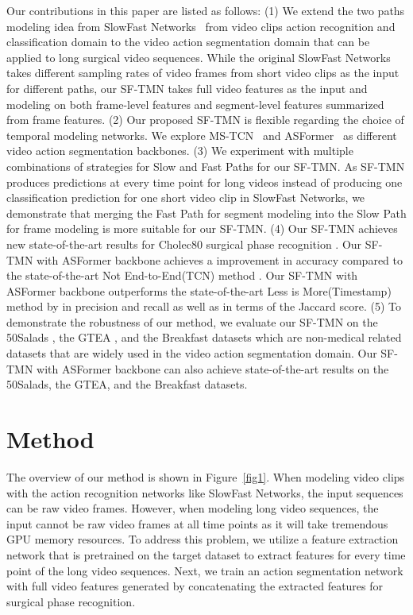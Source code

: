 \documentclass[sn-mathphys,Numbered]{sn-jnl}
\theoremstyle{thmstyleone}\newtheorem{theorem}{Theorem}\newtheorem{proposition}[theorem]{Proposition}
\theoremstyle{thmstyletwo}\newtheorem{example}{Example}\newtheorem{remark}{Remark}
\theoremstyle{thmstylethree}\newtheorem{definition}{Definition}
\begin{document}
Our contributions in this paper are listed as follows: (1) We extend the two paths modeling idea from SlowFast Networks~\cite{feichtenhofer2019slowfast} from video clips action recognition and classification domain to the video action segmentation domain that can be applied to long surgical video sequences. While the original SlowFast Networks takes different sampling rates of video frames from short video clips as the input for different paths, our SF-TMN takes full video features as the input and modeling on both frame-level features and segment-level features summarized from frame features. (2) Our proposed SF-TMN is flexible regarding the choice of temporal modeling networks. We explore MS-TCN~\cite{farha2019ms} and ASFormer~\cite{yi2021asformer} as different video action segmentation backbones. (3) We experiment with multiple combinations of strategies for Slow and Fast Paths for our SF-TMN. As SF-TMN produces predictions at every time point for long videos instead of producing one classification prediction for one short video clip in SlowFast Networks, we demonstrate that merging the Fast Path for segment modeling into the Slow Path for frame modeling is more suitable for our SF-TMN. (4) Our SF-TMN achieves new state-of-the-art results for Cholec80 surgical phase recognition \cite{twinanda2016endonet}. Our SF-TMN with ASFormer backbone achieves a  improvement in accuracy compared to the state-of-the-art Not End-to-End(TCN) method \cite{yi2022not}. Our SF-TMN with ASFormer backbone outperforms the state-of-the-art Less is More(Timestamp) method \cite{wang2022less} by  in precision and recall as well as  in terms of the Jaccard score. (5) To demonstrate the robustness of our method, we evaluate our SF-TMN on the 50Salads \cite{stein2013combining}, the GTEA \cite{fathi2011learning}, and the Breakfast \cite{kuehne2014language} datasets which are non-medical related datasets that are widely used in the video action segmentation domain. Our SF-TMN with ASFormer backbone can also achieve state-of-the-art results on the 50Salads, the GTEA, and the Breakfast datasets.


\section{Method}
The overview of our method is shown in Figure~\ref{fig1}. When modeling video clips with the action recognition networks like SlowFast Networks, the input sequences can be raw video frames. However, when modeling long video sequences, the input cannot be raw video frames at all time points as it will take tremendous GPU memory resources. To address this problem, we utilize a feature extraction network that is pretrained on the target dataset to extract features for every time point of the long video sequences. Next, we train an action segmentation network with full video features generated by concatenating the extracted features for surgical phase recognition. 
\end{document}
